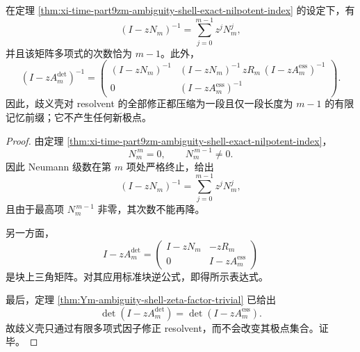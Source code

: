 \begin{corollary}[瞬态修正的精确记忆深度]\label{cor:xi-time-part9zm-ambiguity-shell-exact-memory-depth}
在定理 \ref{thm:xi-time-part9zm-ambiguity-shell-exact-nilpotent-index} 的设定下，有
\[
(I-zN_m)^{-1}
=
\sum_{j=0}^{m-1} z^jN_m^j,
\]
并且该矩阵多项式的次数恰为 \(m-1\)。此外，
\[
(I-zA_m^{\mathrm{det}})^{-1}
=
\begin{pmatrix}
(I-zN_m)^{-1} &
(I-zN_m)^{-1}\,zR_m\,(I-zA_m^{\mathrm{ess}})^{-1}\\[4pt]
0 &
(I-zA_m^{\mathrm{ess}})^{-1}
\end{pmatrix}.
\]
因此，歧义壳对 resolvent 的全部修正都压缩为一段且仅一段长度为 \(m-1\) 的有限记忆前缀；它不产生任何新极点。
\end{corollary}
\begin{proof}
由定理 \ref{thm:xi-time-part9zm-ambiguity-shell-exact-nilpotent-index}，
\[
N_m^{\,m}=0,
\qquad
N_m^{\,m-1}\neq 0.
\]
因此 Neumann 级数在第 \(m\) 项处严格终止，给出
\[
(I-zN_m)^{-1}
=
\sum_{j=0}^{m-1} z^jN_m^j,
\]
且由于最高项 \(N_m^{\,m-1}\) 非零，其次数不能再降。

另一方面，
\[
I-zA_m^{\mathrm{det}}
=
\begin{pmatrix}
I-zN_m & -zR_m\\
0 & I-zA_m^{\mathrm{ess}}
\end{pmatrix}
\]
是块上三角矩阵。对其应用标准块逆公式，即得所示表达式。

最后，定理 \ref{thm:Ym-ambiguity-shell-zeta-factor-trivial} 已给出
\[
\det(I-zA_m^{\mathrm{det}})=\det(I-zA_m^{\mathrm{ess}}).
\]
故歧义壳只通过有限多项式因子修正 resolvent，而不会改变其极点集合。证毕。
\end{proof}

